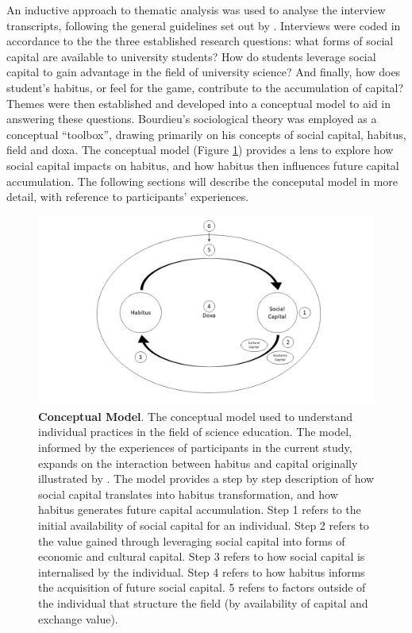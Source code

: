 An inductive approach to thematic analysis was used to analyse the interview transcripts, following the general guidelines set out by \cite{Braun_2006}. Interviews were coded in accordance to the the three established research questions:  what forms of social capital are available to university students? How do students leverage social capital to gain advantage in the field of university science? And finally, how does student's habitus, or feel for the game, contribute to the accumulation of capital? Themes were then established and developed into a conceptual model to aid in answering these questions. Bourdieu's sociological theory was employed as a conceptual ``toolbox'', drawing primarily on his concepts of social capital, habitus, field and doxa. The conceptual model (Figure \ref{fig:HabitusSocCap_TheoreticalModel_C6}) provides a lens to explore how social capital impacts on habitus, and how habitus then influences future capital accumulation. The following sections will describe the conceputal model in more detail, with reference to participants' experiences. 

\begin{figure}[ht]
\centering
\includegraphics[width=\textwidth]{HabitusSocCap_TheoreticalModel.png}
\caption{\label{fig:HabitusSocCap_TheoreticalModel_C6}\textbf{Conceptual Model}. The conceptual model used to understand individual practices in the field of science education. The model, informed by the experiences of participants in the current study, expands on the interaction between habitus and capital originally illustrated by \cite{Bourdieu1984}. The model provides a step by step description of how social capital translates into habitus transformation, and how habitus generates future capital accumulation. Step 1 refers to the initial availability of social capital for an individual. Step 2 refers to the value gained through leveraging social capital into forms of economic and cultural capital. Step 3 refers to how social capital is internalised by the individual. Step 4 refers to how habitus informs the acquisition of future social capital. 5 refers to factors outside of the individual that structure the field (by availability of capital and exchange value).}
\end{figure}

